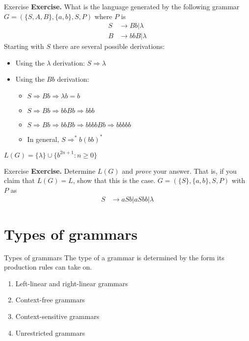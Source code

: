 \documentclass[10pt]{beamer}
\begin{document}
\begin{frame}{Exercise}
    \textbf{Exercise.} What is the language generated by the following grammar $G=(\{S,A,B\}, \{a,b\}, S, P)$ where $P$ is
    \begin{align*}
        S & \rightarrow Bb|\lambda  \\
        B & \rightarrow bbB|\lambda
    \end{align*}
    Starting with $S$ there are several possible derivations:
    \begin{itemize}
        \item Using the $\lambda$ derivation: $S \Rightarrow \lambda$

        \item Using the $Bb$ derivation:
              \begin{itemize}
                  \item $S \Rightarrow Bb \Rightarrow \lambda b = b $
                  \item $S \Rightarrow Bb \Rightarrow bbBb \Rightarrow bbb$
                  \item $S \Rightarrow Bb \Rightarrow bbBb \Rightarrow bbbbBb \Rightarrow bbbbb$
                  \item In general, $S \Rightarrow^* b(bb)^*$
              \end{itemize}
    \end{itemize}
    $L(G) = \{\lambda\} \cup \{b^{2n+1} : n \geq 0\}$
\end{frame}

\begin{frame}[t]{Exercise}
    \textbf{Exercise.} Determine $L(G)$ and \textit{prove} your answer. That is, if you claim that $L(G) = L$, show that this is the case. $G=(\{S\}, \{a,b\}, S, P)$ with $P$ as
    \begin{align*}
        S & \rightarrow aSb | aSbb | \lambda
    \end{align*}

\end{frame}

\section{Types of grammars}

\begin{frame}{Types of grammars}
    The type of a grammar is determined by the form its production rules can take on.
    \begin{enumerate}[1.]
        \item Left-linear and right-linear grammars
        \item Context-free grammars
        \item Context-sensitive grammars
        \item Unrestricted grammars
    \end{enumerate}
\end{frame}
\end{document}
